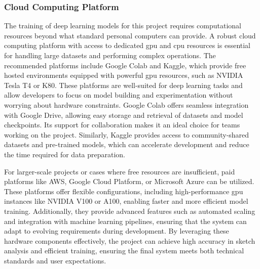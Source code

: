 \subsubsection{Cloud Computing Platform}  
The training of deep learning models for this project requires computational resources beyond what standard personal computers can provide. A robust cloud computing platform with access to dedicated \gls{gpu} and \gls{cpu} resources is essential for handling large datasets and performing complex operations. The recommended platforms include Google Colab and Kaggle, which provide free hosted environments equipped with powerful \gls{gpu} resources, such as NVIDIA Tesla T4 or K80. These platforms are well-suited for deep learning tasks and allow developers to focus on model building and experimentation without worrying about hardware constraints. Google Colab offers seamless integration with Google Drive, allowing easy storage and retrieval of datasets and model checkpoints. Its support for collaboration makes it an ideal choice for teams working on the project. Similarly, Kaggle provides access to community-shared datasets and pre-trained models, which can accelerate development and reduce the time required for data preparation.  

For larger-scale projects or cases where free resources are insufficient, paid platforms like AWS, Google Cloud Platform, or Microsoft Azure can be utilized. These platforms offer flexible configurations, including high-performance \gls{gpu} instances like NVIDIA V100 or A100, enabling faster and more efficient model training. Additionally, they provide advanced features such as automated scaling and integration with machine learning pipelines, ensuring that the system can adapt to evolving requirements during development. By leveraging these hardware components effectively, the project can achieve high accuracy in sketch analysis and efficient training, ensuring the final system meets both technical standards and user expectations. 
    \pagebreak
 
